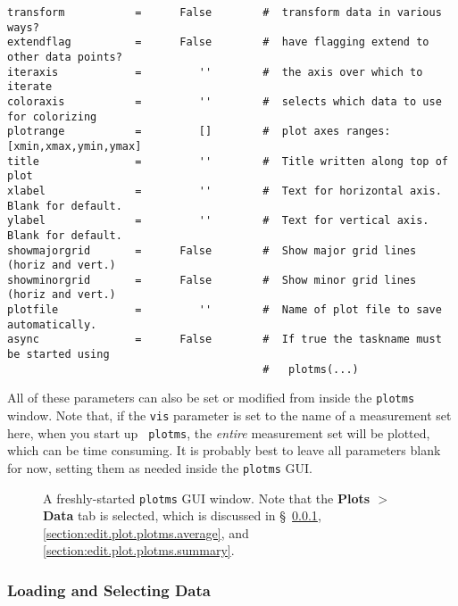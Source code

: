 \begin{verbatim}
transform           =      False        #  transform data in various ways?
extendflag          =      False        #  have flagging extend to other data points?
iteraxis            =         ''        #  the axis over which to iterate
coloraxis           =         ''        #  selects which data to use for colorizing
plotrange           =         []        #  plot axes ranges: [xmin,xmax,ymin,ymax]
title               =         ''        #  Title written along top of plot
xlabel              =         ''        #  Text for horizontal axis. Blank for default.
ylabel              =         ''        #  Text for vertical axis. Blank for default.
showmajorgrid       =      False        #  Show major grid lines (horiz and vert.)
showminorgrid       =      False        #  Show minor grid lines (horiz and vert.)
plotfile            =         ''        #  Name of plot file to save automatically.
async               =      False        #  If true the taskname must be started using
                                        #   plotms(...)

\end{verbatim}
\normalsize All of these parameters can also be set or modified from
inside the {\tt plotms} window. Note that, if the {\tt vis} parameter
is set to the name of a measurement set here, when you start up {\tt
  plotms}, the {\it entire} measurement set will be plotted, which can
be time consuming. It is probably best to leave all parameters blank
for now, setting them as needed inside the {\tt plotms} GUI.

\begin{figure}[h!]
\begin{center}
\caption{\label{fig:plotms_empty} A freshly-started {\tt plotms} GUI
  window. Note that the {\bf Plots $>$ Data} tab is selected, which is
  discussed in \S~\ref{section:edit.plot.plotms.select},
  \ref{section:edit.plot.plotms.average}, and
  \ref{section:edit.plot.plotms.summary}.}
\hrulefill
\end{center}
\end{figure}

\subsubsection{Loading and Selecting Data}
\label{section:edit.plot.plotms.select}

